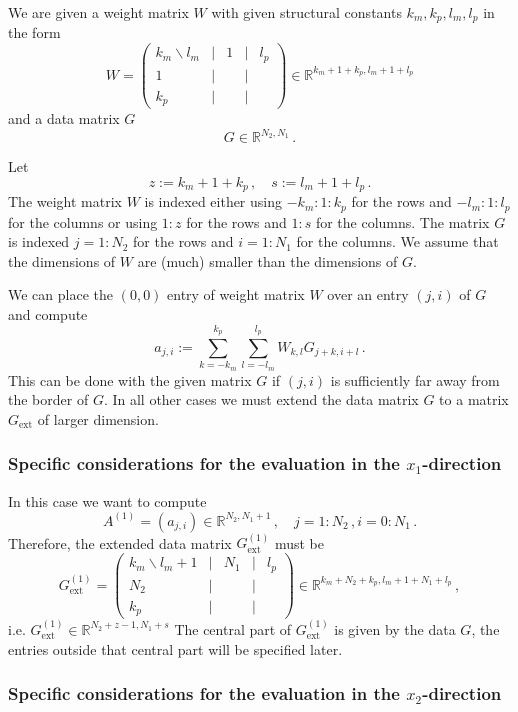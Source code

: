 \documentclass[a4,12pt]{article}
\newcommand{\Real}[1]{\mathbb{R}^{#1}}
\begin{document}
We are given a weight matrix $W$ with given structural constants $k_m, k_p,
l_m,l_p$ in the form
\[
W=
\begin{pmatrix}
k_m\backslash{}l_m&|&1&|& l_p\\\hline
1&|&&|&\\\hline
k_p&|&&|&
\end{pmatrix}
\in\Real{k_m+1+k_p, l_m+1+l_p}
\]
and a data matrix $G$
\[
G \in \Real{N_2,N_1}\,.
\]

Let 
\[
z:=k_m+1+k_p\,,\quad s:=l_m+1+l_p\,.
\]
The weight matrix $W$ is indexed either using $-k_m:1:k_p$ for the rows and
$-l_m:1:l_p$ for the columns or using $1:z$ for the rows and $1:s$ for the
columns. 
The matrix $G$ is indexed $j=1:N_2$ for the rows and $i=1:N_1$ for the columns.
We assume that the dimensions of $W$ are (much) smaller than the dimensions of
$G$.  

We can place the $(0,0)$ entry of weight matrix $W$ over an entry $(j,i)$ of $G$
and compute 
\[
a_{j,i}:=\sum_{k=-k_m}^{k_p}\sum_{l=-l_m}^{l_p}W_{k,l}G_{j+k,i+l}\,.
\]
This can be done with the given matrix $G$ if $(j,i)$ is sufficiently far away
from the border of $G$. In all other cases we must extend the data matrix $G$ to
a matrix $G_\text{ext}$ of larger dimension. 

\subsubsection*{Specific considerations for the evaluation in the
  $x_1$-direction} 

In this case we want to compute
\[
A^{(1)}=(a_{j,i})\in\Real{N_2,N_1+1}\,,\quad j=1:N_2\,, i=0:N_1\,.
\]
Therefore, the extended data matrix $G_\text{ext}^{(1)}$ must be
\[
G_\text{ext}^{(1)}=
\begin{pmatrix}
k_m\backslash{}l_m+1&|&N_1&|& l_p\\\hline
N_2&|&&|&\\\hline
k_p&|&&|&
\end{pmatrix}
\in\Real{k_m+N_2+k_p,l_m+1+N_1+l_p}\,,
\]
i.e. $G_\text{ext}^{(1)}\in\Real{N_2+z-1,N_1+s}$
The central part of $G_\text{ext}^{(1)}$ is given by the data $G$, the entries
outside that central part will be specified later.

\subsubsection*{Specific considerations for the evaluation in the
  $x_2$-direction} 
\end{document}
